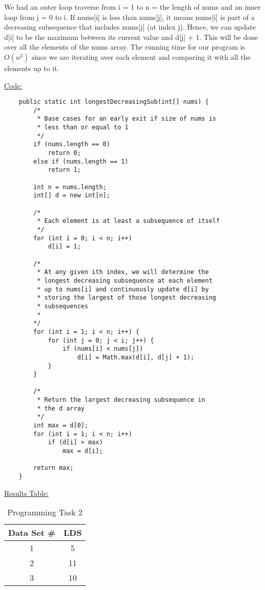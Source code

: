 \documentclass[12pt,letterpaper,final]{report}
\begin{document}
We had an outer loop traverse from i = 1 to n = the length of nums and an inner loop from j = 0 to i. If nums[i] is less than nums[j], it means nums[i] is part of a decreasing subsequence that includes nums[j] (at index j). Hence, we can update d[i] to be the maximum between its current value and d[j] + 1. This will be done over all the elements of the nums array. The running time for our program is $O(n^2)$ since we are iterating over each element and comparing it with all the elements up to it. 


\bigskip

\underline{Code:}

\begin{lstlisting}
    public static int longestDecreasingSub(int[] nums) {
        /*
         * Base cases for an early exit if size of nums is
         * less than or equal to 1
         */
        if (nums.length == 0)
            return 0;
        else if (nums.length == 1)
            return 1;

        int n = nums.length;
        int[] d = new int[n];

        /*
         * Each element is at least a subsequence of itself
         */
        for (int i = 0; i < n; i++)
            d[i] = 1;

        /* 
         * At any given ith index, we will determine the
         * longest decreasing subsequence at each element 
         * up to nums[i] and continuously update d[i] by 
         * storing the largest of those longest decreasing
         * subsequences
         * 
        */
        for (int i = 1; i < n; i++) {
            for (int j = 0; j < i; j++) {
                if (nums[i] < nums[j])
                    d[i] = Math.max(d[i], d[j] + 1);
            }
        }

        /*
         * Return the largest decreasing subsequence in
         * the d array
         */
        int max = d[0];
        for (int i = 1; i < n; i++)
            if (d[i] > max)
                max = d[i];

        return max;
    }

\end{lstlisting}

\bigskip


\underline{Results Table:}

\begin{table}[H]
    \centering
    \begin{tabular}{|c|c|}
    \hline
    Data Set \# & LDS \\
    \hline
    1 & 5 \\
    \hline
    2 & 11 \\
    \hline
    3 & 10 \\
    \hline
    \end{tabular}
    \caption{Programming Task 2}
    \label{tab:my_table}
\end{table}
\end{document}
